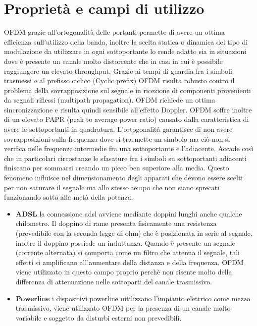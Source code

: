 \begin{itemize}
	
\label{sec:problem}
\section{Proprietà e campi di utilizzo}
OFDM grazie all'ortogonalità delle portanti permette di avere un ottima efficienza sull'utilizzo della banda, inoltre la scelta statica o dinamica del tipo di modulazione da utilizzare in ogni sottoportante lo rende adatto sia in situazioni dove è presente un canale molto distorcente che in casi in cui è possibile raggiungere un elevato throughput. Grazie ai tempi di guardia fra i simboli trasmessi e al prefisso ciclico (Cyclic prefix) OFDM risulta robusto contro il problema della sovrapposizione sul segnale in ricezione di componenti provenienti da segnali riflessi (multipath propagation). OFDM richiede un ottima sincronizzazione e risulta quindi sensibile all'effetto Doppler. OFDM soffre inoltre di un elevato PAPR (peak to average power ratio) causato dalla caratteristica di avere le sottoportanti in quadratura. L'ortogonalità garantisce di non avere sovrapposizioni sulla frequenza dove si trasmette un simbolo ma ciò non si verifica nelle frequenze intermedie fra una sottoportante e l'adiacente. Accade così che in particolari circostanze le sfasature fra i simboli su sottoportanti adiacenti finiscano per sommarsi creando un picco ben superiore alla media. Questo fenomeno influisce nel dimensionamento degli apparati che devono essere scelti per non saturare il segnale ma allo stesso tempo che non siano sprecati funzionando sotto alla metà della potenza.
\cite{papr}
\begin{itemize}
	\item \textbf{ADSL} la connessione adsl avviene mediante doppini lunghi anche qualche chilometro. Il doppino di rame presenta fisicamente una resistenza (prevedibile con la seconda legge di ohm) che è posizionata in serie al segnale, inoltre il doppino possiede un induttanza. Quando è presente un segnale (corrente alternata) si comporta come un filtro che attenua il segnale, tali effetti si amplificano all'aumentare della distanza e della frequenza. OFDM viene utilizzato in questo campo proprio perchè non risente molto della differenza di attenuazione nelle sottoparti del canale trasmissivo.
\end{itemize}
\begin{itemize}
	\item \textbf{Powerline} i dispositivi powerline uitilizzano l'impianto elettrico come mezzo trasmissivo, viene utilizzato OFDM per la presenza di un canale molto variabile e soggetto da disturbi esterni non prevedibili.

\end{itemize}
\end{itemize}
